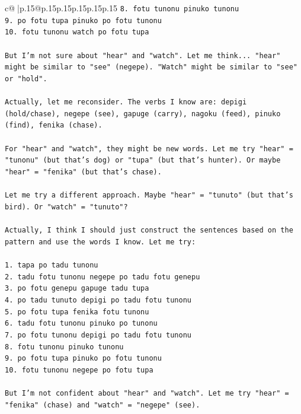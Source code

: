 \documentclass{article}
\begin{document}
{\begin{supertabular}{c@{$\;$}|p{.15\linewidth}@{}p{.15\linewidth}p{.15\linewidth}p{.15\linewidth}p{.15\linewidth}p{.15\linewidth}}
{{{\texttt{8. fotu tunonu pinuko tunonu} \\
\texttt{9. po fotu tupa pinuko po fotu tunonu} \\
\texttt{10. fotu tunonu watch po fotu tupa} \\
\\ 
\texttt{But I'm not sure about "hear" and "watch". Let me think... "hear" might be similar to "see" (negepe). "Watch" might be similar to "see" or "hold".} \\
\\ 
\texttt{Actually, let me reconsider. The verbs I know are: depigi (hold/chase), negepe (see), gapuge (carry), nagoku (feed), pinuko (find), fenika (chase).} \\
\\ 
\texttt{For "hear" and "watch", they might be new words. Let me try "hear" = "tunonu" (but that's dog) or "tupa" (but that's hunter). Or maybe "hear" = "fenika" (but that's chase).} \\
\\ 
\texttt{Let me try a different approach. Maybe "hear" = "tunuto" (but that's bird). Or "watch" = "tunuto"?} \\
\\ 
\texttt{Actually, I think I should just construct the sentences based on the pattern and use the words I know. Let me try:} \\
\\ 
\texttt{1. tapa po tadu tunonu} \\
\texttt{2. tadu fotu tunonu negepe po tadu fotu genepu} \\
\texttt{3. po fotu genepu gapuge tadu tupa} \\
\texttt{4. po tadu tunuto depigi po tadu fotu tunonu} \\
\texttt{5. po fotu tupa fenika fotu tunonu} \\
\texttt{6. tadu fotu tunonu pinuko po tunonu} \\
\texttt{7. po fotu tunonu depigi po tadu fotu tunonu} \\
\texttt{8. fotu tunonu pinuko tunonu} \\
\texttt{9. po fotu tupa pinuko po fotu tunonu} \\
\texttt{10. fotu tunonu negepe po fotu tupa} \\
\\ 
\texttt{But I'm not confident about "hear" and "watch". Let me try "hear" = "fenika" (chase) and "watch" = "negepe" (see).} \\
\\ 
}}}
\end{supertabular}}
\end{document}

